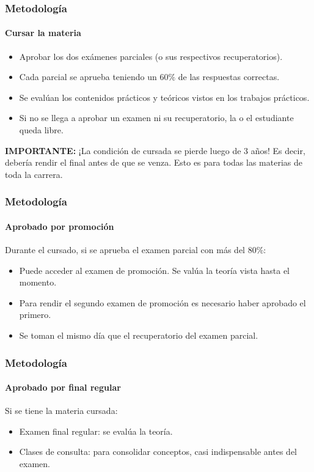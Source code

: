 \documentclass[11pt,a4paper,spanish]{beamer}
\begin{document}
\begin{frame}

    \frametitle{Metodología}
    \framesubtitle{Cursar la materia}

\begin{itemize}

    \item Aprobar los dos exámenes parciales (o sus respectivos
        recuperatorios).
    \item Cada parcial se aprueba teniendo un $60\%$ de las respuestas
        correctas.
    \item Se evalúan los contenidos prácticos y teóricos vistos en los
        trabajos prácticos.
    \item Si no se llega a aprobar un examen ni su recuperatorio, la o el
        estudiante queda libre.

\end{itemize}

\textbf{IMPORTANTE:} ¡La condición de cursada se pierde luego de 3 años! Es
    decir, debería rendir el final antes de que se venza. Esto es para todas
    las materias de toda la carrera.

\end{frame}

\begin{frame}

    \frametitle{Metodología}
    \framesubtitle{Aprobado por promoción}


Durante el cursado, si se aprueba el examen parcial con más del $80\%$:

\begin{itemize}
    \item Puede acceder al examen de promoción. Se valúa la teoría vista hasta
        el momento.
    \item Para rendir el segundo examen de promoción es necesario haber
        aprobado el primero.
    \item Se toman el mismo día que el recuperatorio del examen parcial.
\end{itemize}

\end{frame}

\begin{frame}

    \frametitle{Metodología}
    \framesubtitle{Aprobado por final regular}

Si se tiene la materia cursada:
\begin{itemize}
    \item Examen final regular: se evalúa la teoría.
    \item Clases de consulta: para consolidar conceptos, casi indispensable
        antes del examen.
\end{itemize}

\end{frame}
\end{document}
